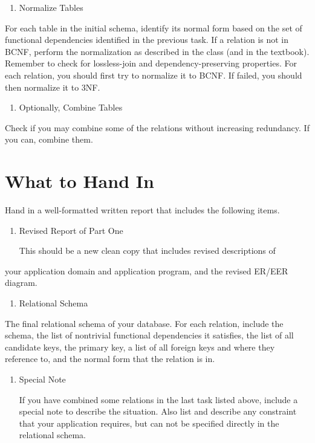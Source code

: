 \documentclass[11pt]{article}
\begin{document}
\begin{enumerate}
\item Normalize Tables
\end{enumerate}

For each table in the initial schema, identify its normal form based
on the set of functional dependencies identified in the previous
task. If a relation is not in BCNF, perform the normalization as
described in the class (and in the textbook). Remember to check for
lossless-join and dependency-preserving properties. For each relation,
you should first try to normalize it to BCNF. If failed, you should
then normalize it to 3NF.

\begin{enumerate}
\item Optionally, Combine Tables
\end{enumerate}

Check if you may combine some of the relations without increasing
redundancy. If you can, combine them.
\section*{What to Hand In}
\label{sec-2}


Hand in a well-formatted written report that includes the following
items.

\begin{enumerate}
\item Revised Report of Part One

 This should be a new clean copy that includes revised descriptions of
\end{enumerate}
your application domain and application program, and the revised
ER/EER diagram.

\begin{enumerate}
\item Relational Schema
\end{enumerate}

The final relational schema of your database. For each relation,
include the schema, the list of nontrivial functional dependencies it
satisfies, the list of all candidate keys, the primary key, a list of
all foreign keys and where they reference to, and the normal form that
the relation is in.

\begin{enumerate}
\item Special Note

 If you have combined some relations in the last task listed above,
 include a special note to describe the situation. Also list and
 describe any constraint that your application requires, but can not
 be specified directly in the relational schema.
\end{enumerate}
\end{document}
